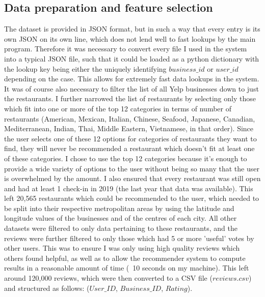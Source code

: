 \documentclass[conference]{IEEEtran}
\begin{document}
\subsection{Data preparation and feature selection}
The dataset is provided in JSON format, but in such a way that every entry is its own JSON on its own line, 
which does not lend well to fast lookups by the main program. 
Therefore it was necessary to convert every file I used in the system into a typical JSON file, such that it could 
be loaded as a python dictionary with the lookup key being either the uniquely identifying $business\_id$ or 
$user\_id$ depending on the case. 
This allows for extremely fast data lookups in the system. 
It was of course also necessary to filter the list of all Yelp businesses down to just the restaurants. 
I further narrowed the list of restaurants by selecting only those which fit into one or more of the top 12 
categories in terms of number of restaurants (American, Mexican, Italian, Chinese, Seafood, Japanese, Canadian, 
Mediterranean, Indian, Thai, Middle Eastern, Vietnamese, in that order). 
Since the user selects one of these 12 options for categories of restaurants they want to find, they will 
never be recommended a restaurant which doesn't fit at least one of these categories. 
I chose to use the top 12 categories because it's enough to provide a wide variety of options to the user without 
being so many that the user is overwhelmed by the amount. 
I also ensured that every restaurant was still open and had at least 1 check-in in 2019 (the last year that 
data was available). 
This left 20,565 restaurants which could be recommended to the user, which needed to be split into their respective 
metropolitan areas by using the latitude and longitude values of the businesses and of the centres of each city. 
All other datasets were filtered to only data pertaining to these restaurants, and the reviews were further filtered 
to only those which had 5 or more 'useful' votes by other users. 
This was to ensure I was only using high quality reviews which others found helpful, as well as to allow the 
recommender system to compute results in a reasonable amount of time (~10 seconds on my machine). 
This left around 120,000 reviews, which were then converted to a CSV file ($reviews.csv$) and structured as follows: 
($User\_ID$, $Business\_ID$, $Rating$). 
\end{document}
